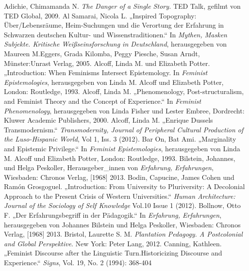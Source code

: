 \begin{thebibliography}{100} %
  Adichie, Chimamanda N. \emph{The Danger of a Single Story.} TED Talk, gefilmt von TED Global, 2009. 
 Al Samarai, Nicola L. „Inspired Topography: Über/Lebensräume, Heim-Suchungen und die
Verortung der Erfahrung in Schwarzen deutschen Kultur- und Wissenstraditionen.“
In \emph{Mythen, Masken Subjekte. Kritische Weißseinsforschung in Deutschland}, herausgegeben von Maureen M.Eggers, Grada Kilomba, Peggy Piesche, Susan Arndt, Münster:Unrast Verlag, 2005.
 Alcoff, Linda M. und Elizabeth Potter. „Introduction: When Feminisms Intersect Epistemology. In
\emph{Feminist Epistemologies}, herausgegeben von Linda M. Alcoff und Elizabeth Potter, London: Routledge, 1993.
 Alcoff, Linda M. „Phenomenology, Post-structuralism, and
Feminist Theory and the Concept of
Experience.“ In \emph{Feminist Phenomenology}, herausgegeben von Linda Fisher und Lester Embree, Dordrecht: Kluwer Academic Publishers, 2000.
 Alcoff, Linda M. „Enrique Dussels Transmodernism.“ \emph{Transmodernity, Journal of Peripheral
Cultural Production of the Luso-Hispanic World}, Vol 1, Iss. 3 (2012).
 Bar On, Bat Ami. „Marginality and Epistemic Privilege.“ In
\emph{Feminist Epistemologies},
herausgegeben von Linda M. Alcoff und Elizabeth Potter, London: Routledge, 1993.
 Bilstein, Johannes, und  Helga Peskoller, Herausgeber\_innen von
\emph{Erfahrung, Erfahrungen}, Wiesbaden: Chronos Verlag, [1968] 2013.
 Bodin, Capucine, James Cohen und Ramón Grosgoguel. „Introduction: From University to
Pluriversity: A Decolonial Approach to the Present Crisis of Western
Universities.“ \emph{Human Architecture: Journal of the Sociology of Self
Knowledge} Vol.10 Issue 1 (2012).
 Bollnow, Otto F. „Der Erfahrungsbegriff in der Pädagogik.“ In
\emph{Erfahrung, Erfahrungen},
herausgegeben von Johannes Bilstein und Helga Peskoller, Wiesbaden: Chronos Verlag, [1968] 2013.
 Bristol, Laurette S. M. \emph{Plantation Pedagogy. A
Postcolonial and Global Perspektive}. New York:
Peter Lang, 2012.
 Canning, Kathleen. „Feminist Discourse after the Linguistic Turn.Historicizing Discourse and
Experience.“ \emph{Signs}, Vol. 19, No. 2 (1994): 368-404

\end{thebibliography}

